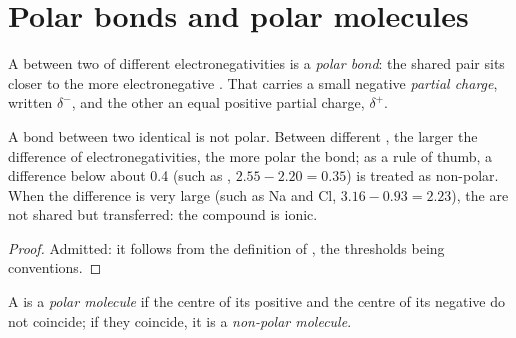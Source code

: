 \section{Polar bonds and polar molecules}

\begin{definition}\label{def:g11:polarity-and-cohesion:polar-bond}
A  between two  of different electronegativities is a
\emph{polar bond}: the shared pair sits closer to the
more electronegative . That  carries a small negative
\emph{partial charge}, written $\delta^-$, and the
other  an equal positive partial charge, $\delta^+$.
\end{definition}

\begin{proposition}\label{prop:g11:polarity-and-cohesion:polar-bond}
A bond between two identical  is not polar. Between different
, the larger the difference of electronegativities, the more polar
the bond; as a rule of thumb, a difference below about 0.4 (such as
, $2.55 - 2.20 = 0.35$) is treated as non-polar. When the
difference is very large (such as Na and Cl, $3.16 - 0.93 = 2.23$), the
 are not shared but transferred: the compound is ionic.
\end{proposition}

\begin{proof}
Admitted: it follows from the definition of , the
thresholds being conventions.
\end{proof}

\begin{definition}\label{def:g11:polarity-and-cohesion:polar-molecule}
A  is a \emph{polar molecule} if the
centre of its positive  and the centre of its negative
 do not coincide; if they coincide, it is a
\emph{non-polar molecule}.
\end{definition}

